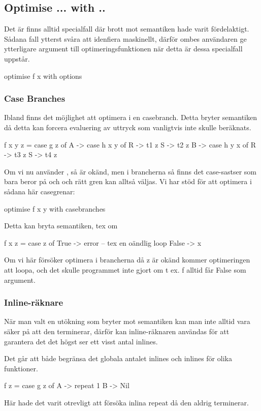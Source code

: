 \documentclass[../Optimise]{subfiles}
\begin{document}
\subsection{Optimise ... with ..}

  Det är finns alltid specialfall där brott mot semantiken hade varit fördelaktigt.
  Sådana fall ytterst svåra att idenfiera maskinellt, därför ombes användaren
  ge ytterligare argument till optimeringsfunktionen när detta är dessa specialfall uppstår.

\begin{codeEx}
  optimise f x with { options }
\end{codeEx}



\subsubsection{Case Branches}
      Ibland finns det möjlighet att optimera i en casebranch. Detta bryter semantiken
      då detta kan forcera evaluering av uttryck som vanligtvis inte skulle beräknats.
\begin{codeEx}
f x y z = case g z of
        A -> case h x y of
              R -> t1 z
              S -> t2 z
        B -> case h y x of
              R -> t3 z
              S -> t4 z
\end{codeEx}


      Om vi nu använder , så är  okänd, men i brancherna så
      finns det case-sastser som bara beror på  och  och rätt gren kan alltså väljas. Vi har stöd för att optimera i sådana här casegrenar:

\begin{codeEx}
  optimise f x y with { casebranches }
\end{codeEx}

       Detta kan bryta semantiken, tex om
\begin{codeEx}
f x z = case z of
    True  -> error -- tex en oändlig loop
    False -> x
\end{codeEx}
      Om vi här försöker optimera i brancherna då z är okänd kommer optimeringen
      att loopa, och det skulle programmet inte gjort om t ex. f alltid får False som
      argument.

\subsubsection{Inline-räknare}
     När man valt en utökning som bryter mot semantiken kan man inte alltid vara säker på
     att den terminerar, därför kan inline-räknaren användas för att garantera det det högst
     ser ett visst antal inlines.

     Det går att både begränsa det globala antalet inlines och inlines för olika funktioner.

\begin{codeEx}
     f z = case g z of
        A -> repeat 1
        B -> Nil
\end{codeEx}

    Här hade det varit otrevligt att försöka inlina repeat då den aldrig terminerar.
\end{document}

